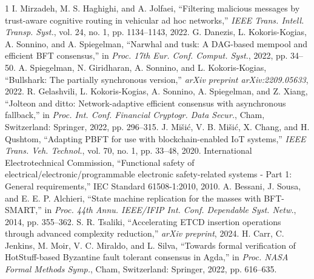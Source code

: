 \documentclass[lettersize,journal]{IEEEtran}
\begin{document}
\begin{thebibliography}{1}
I. Mirzadeh, M. S. Haghighi, and A. Jolfaei, ``Filtering malicious messages by trust-aware cognitive routing in vehicular ad hoc networks,'' \textit{IEEE Trans. Intell. Transp. Syst.}, vol. 24, no. 1, pp. 1134--1143, 2022.
G. Danezis, L. Kokoris-Kogias, A. Sonnino, and A. Spiegelman, ``Narwhal and tusk: A DAG-based mempool and efficient BFT consensus,'' in \textit{Proc. 17th Eur. Conf. Comput. Syst.}, 2022, pp. 34--50.
A. Spiegelman, N. Giridharan, A. Sonnino, and L. Kokoris-Kogias, ``Bullshark: The partially synchronous version,'' \textit{arXiv preprint arXiv:2209.05633}, 2022.
R. Gelashvili, L. Kokoris-Kogias, A. Sonnino, A. Spiegelman, and Z. Xiang, ``Jolteon and ditto: Network-adaptive efficient consensus with asynchronous fallback,'' in \textit{Proc. Int. Conf. Financial Cryptogr. Data Secur.}, Cham, Switzerland: Springer, 2022, pp. 296--315.
J. Mišić, V. B. Mišić, X. Chang, and H. Qushtom, ``Adapting PBFT for use with blockchain-enabled IoT systems,'' \textit{IEEE Trans. Veh. Technol.}, vol. 70, no. 1, pp. 33--48, 2020.
International Electrotechnical Commission, ``Functional safety of electrical/electronic/programmable electronic safety-related systems - Part 1: General requirements,'' IEC Standard 61508-1:2010, 2010.
A. Bessani, J. Sousa, and E. E. P. Alchieri, ``State machine replication for the masses with BFT-SMART,'' in \textit{Proc. 44th Annu. IEEE/IFIP Int. Conf. Dependable Syst. Netw.}, 2014, pp. 355--362.
S. R. Tsaliki, ``Accelerating ETCD insertion operations through advanced complexity reduction,'' \textit{arXiv preprint}, 2024.
H. Carr, C. Jenkins, M. Moir, V. C. Miraldo, and L. Silva, ``Towards formal verification of HotStuff-based Byzantine fault tolerant consensus in Agda,'' in \textit{Proc. NASA Formal Methods Symp.}, Cham, Switzerland: Springer, 2022, pp. 616--635.


\end{thebibliography}


\newpage

 
%
\end{document}
